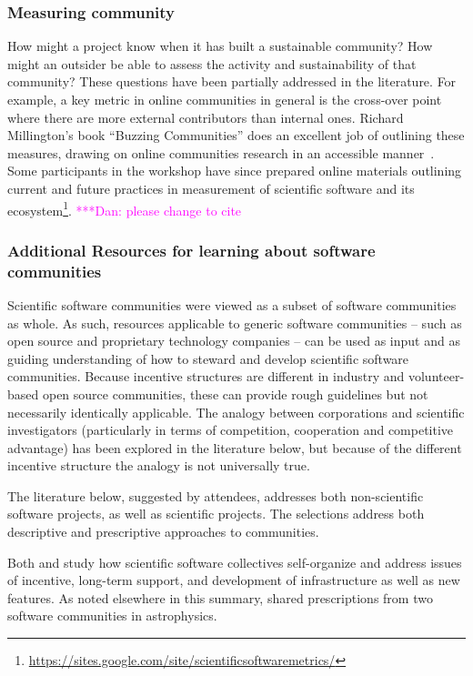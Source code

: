 \documentclass[11pt, oneside]{amsart}
\newcommand{\katznote}[1]{ {\textcolor{magenta}    { ***Dan:      #1 }}}
\begin{document}
\subsubsection{Measuring community}
How might a project know when it has built a sustainable community?  How might an outsider be able to assess the activity and sustainability of that community?  These questions have been partially addressed in the literature.  For example, a key metric in online communities in general is the cross-over point where there are more external contributors than internal ones. Richard Millington's book ``Buzzing Communities'' does an excellent job of outlining these measures, drawing on online communities research in an accessible manner~\cite{millington_buzzing_2012}. Some participants in the workshop have since prepared online materials outlining current and future practices in measurement of scientific software and its ecosystem\footnote{\url{https://sites.google.com/site/scientificsoftwaremetrics/}}. \katznote{please change to cite}

\subsubsection{Additional Resources for learning about software communities}

Scientific software communities were viewed as a subset of software communities
as whole.  As such, resources applicable to generic software communities --
such as open source and proprietary technology companies -- can be used as
input and as guiding understanding of how to steward and develop scientific
software communities.  Because incentive structures are different in industry
and volunteer-based open source communities, these can provide rough guidelines
but not necessarily identically applicable.  The analogy between corporations
and scientific investigators (particularly in terms of competition, cooperation
and competitive advantage) has been explored in the literature below, but
because of the different incentive structure the analogy is not universally
true.

The literature below, suggested by attendees, addresses both non-scientific
software projects, as well as scientific projects.  The selections address both
descriptive and prescriptive approaches to communities.

Both \cite{howison_scientific_2011} and \cite{howison_incentives_2013} 
study how scientific software collectives self-organize and address issues of
incentive, long-term support, and development of infrastructure as well as new
features.  As noted elsewhere in this summary,
\cite{Turk:2013:SCH:2484762.2484782} shared prescriptions from two software
communities in astrophysics.
\end{document}
